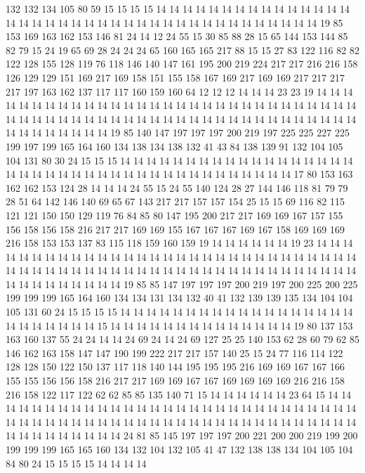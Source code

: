 132 132 134 105 80 59 15 15 15 15 14 14 14 14 14 14 14 14 14 14
14 14 14 14 14 14 14 14 14 14 14 14 14 14 14 14 14 14 14 14
14 14 14 14 14 14 14 14 14 19 85 153 169 163 162 153 146 81 24 14
12 24 55 15 30 85 88 28 15 65 144 153 144 85 82 79 15 24 19 65
69 28 24 24 24 65 160 165 165 217 88 15 15 27 83 122 116 82 82 122
128 155 128 119 76 118 146 140 147 161 195 200 219 224 217 217 216 216 158 126
129 129 151 169 217 169 158 151 155 158 167 169 217 169 169 217 217 217 217 197
163 162 137 117 117 160 159 160 64 12 12 12 14 14 14 23 23 19 14 14
14 14 14 14 14 14 14 14 14 14 14 14 14 14 14 14 14 14 14 14
14 14 14 14 14 14 14 14 14 14 14 14 14 14 14 14 14 14 14 14
14 14 14 14 14 14 14 14 14 14 14 14 14 14 14 14 14 14 14 14
14 14 14 19 85 140 147 197 197 197 200 219 197 225 225 227 225 199 197 199
165 164 160 134 138 134 138 132 41 43 84 138 139 91 132 104 105 104 131 80
30 24 15 15 15 14 14 14 14 14 14 14 14 14 14 14 14 14 14 14
14 14 14 14 14 14 14 14 14 14 14 14 14 14 14 14 14 14 14 14
14 14 14 14 14 17 80 153 163 162 162 153 124 28 14 14 14 24 55 15
24 55 140 124 28 27 144 146 118 81 79 79 28 51 64 142 146 140 69 65
67 143 217 217 157 157 154 25 15 15 69 116 82 115 121 121 150 150 129 119
76 84 85 80 147 195 200 217 217 169 169 167 157 155 156 158 156 158 216 217
217 169 169 155 167 167 167 169 167 158 169 169 169 216 158 153 153 137 83 115
118 159 160 159 19 14 14 14 14 14 14 19 23 14 14 14 14 14 14 14
14 14 14 14 14 14 14 14 14 14 14 14 14 14 14 14 14 14 14 14
14 14 14 14 14 14 14 14 14 14 14 14 14 14 14 14 14 14 14 14
14 14 14 14 14 14 14 14 14 14 14 14 14 14 14 14 14 14 14 19
85 85 147 197 197 197 200 219 197 200 225 200 225 199 199 199 165 164 160 134
134 131 134 132 40 41 132 139 139 135 134 104 104 105 131 60 24 15 15 15
15 14 14 14 14 14 14 14 14 14 14 14 14 14 14 14 14 14 14 14
14 14 14 14 14 14 15 14 14 14 14 14 14 14 14 14 14 14 14 14
14 19 80 137 153 163 160 137 55 24 24 14 14 24 69 24 14 24 69 127
25 25 140 153 62 28 60 79 62 85 146 162 163 158 147 147 190 199 222 217
217 157 140 25 15 24 77 116 114 122 128 128 150 122 150 137 117 118 140 144
195 195 195 216 169 169 167 167 166 155 155 156 156 158 216 217 217 169 169 167
167 169 169 169 169 216 216 158 216 158 122 117 122 62 62 85 85 135 140 71
15 14 14 14 14 14 14 23 64 15 14 14 14 14 14 14 14 14 14 14
14 14 14 14 14 14 14 14 14 14 14 14 14 14 14 14 14 14 14 14
14 14 14 14 14 14 14 14 14 14 14 14 14 14 14 14 14 14 14 14
14 14 14 14 14 14 14 14 14 14 14 14 14 14 14 24 81 85 145 197
197 197 200 221 200 200 219 199 200 199 199 199 165 165 160 134 132 104 132 105
41 47 132 138 138 134 104 105 104 84 80 24 15 15 15 15 14 14 14 14
